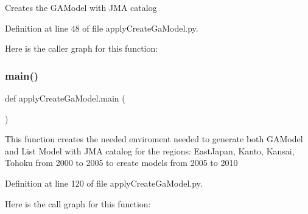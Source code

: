 \begin{DoxyVerb}Creates the GAModel with JMA catalog
\end{DoxyVerb}
 

Definition at line 48 of file apply\+Create\+Ga\+Model.\+py.

Here is the caller graph for this function\+:
\mbox{\label{namespaceapply_create_ga_model_a42e1c23c52dd14e09ed6ff6bb40a9011}} 
\subsubsection{\texorpdfstring{main()}{main()}}
{\footnotesize\ttfamily def apply\+Create\+Ga\+Model.\+main (\begin{DoxyParamCaption}{ }\end{DoxyParamCaption})}

\begin{DoxyVerb}This function creates the needed enviroment needed to generate both GAModel and List Model with JMA catalog
for the regions: EastJapan, Kanto, Kansai, Tohoku
from 2000 to 2005 to create models from 2005 to 2010
\end{DoxyVerb}
 

Definition at line 120 of file apply\+Create\+Ga\+Model.\+py.

Here is the call graph for this function\+:

